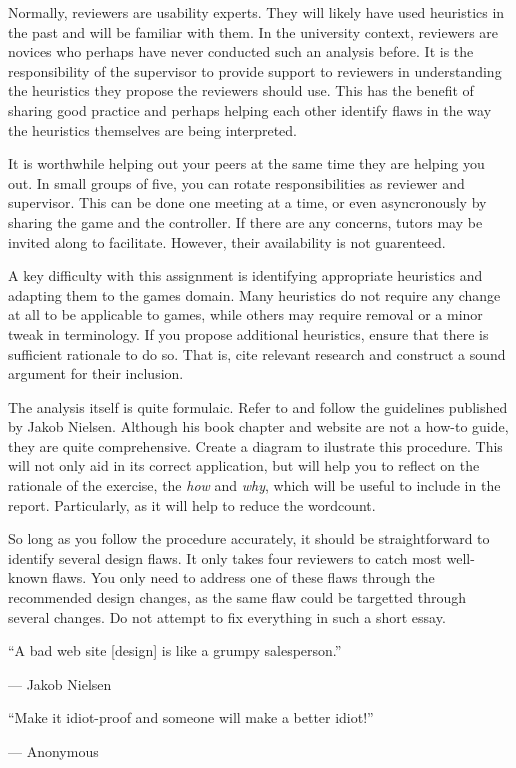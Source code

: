 \documentclass{../fal_assignment}
\begin{document}
Normally, reviewers are usability experts. They will likely have used heuristics in the past and will be familiar with them. In the university context, reviewers are novices who perhaps have never conducted such an analysis before. It is the responsibility of the supervisor to provide support to reviewers in understanding the heuristics they propose the reviewers should use. This has the benefit of sharing good practice and perhaps helping each other identify flaws in the way the heuristics themselves are being interpreted.

It is worthwhile helping out your peers at the same time they are helping you out. In small groups of five, you can rotate responsibilities as reviewer and supervisor. This can be done one meeting at a time, or even asyncronously by sharing the game and the controller. If there are any concerns, tutors may be invited along to facilitate. However, their availability is not guarenteed.

A key difficulty with this assignment is identifying appropriate heuristics and adapting them to the games domain. Many heuristics do not require any change at all to be applicable to games, while others may require removal or a minor tweak in terminology. If you propose additional heuristics, ensure that there is sufficient rationale to do so. That is, cite relevant research and construct a sound argument for their inclusion.

The analysis itself is quite formulaic. Refer to and follow the guidelines published by Jakob Nielsen. Although his book chapter and website are not a how-to guide, they are quite comprehensive. Create a diagram to ilustrate this procedure. This will not only aid in its correct application, but will help you to reflect on the rationale of the exercise, the \textit{how} and \textit{why}, which will be useful to include in the report. Particularly, as it will help to reduce the wordcount. 

So long as you follow the procedure accurately, it should be straightforward to identify several design flaws. It only takes four reviewers to catch most well-known flaws. You only need to address one of these flaws through the recommended design changes, as the same flaw could be targetted through several changes. Do not attempt to fix everything in such a short essay.

\begin{marginquote}
    ``A bad web site [design] is like a grumpy salesperson.''
    
    --- Jakob Nielsen
    
    \marginquoterule

        ``Make it idiot-proof and someone will make a better idiot!''
    
    --- Anonymous
\end{marginquote}
\end{document}
